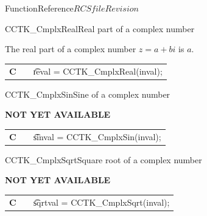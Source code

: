 \begin{cactuspart}{FunctionReference}{$RCSfile$}{$Revision$}
\begin{CCTKFunc}{CCTK\_CmplxReal}{Real part of a complex number}
\label{CCTK-CmplxReal}
\showcargs
\begin{params}
\end{params}
\begin{discussion}
The real part of a complex number $z=a+bi$ is $a$.
\end{discussion}
\begin{examples}
\begin{tabular}{@{}p{3cm}cp{11cm}}
\hfill {\bf C} && {\t reval = CCTK\_CmplxReal(inval)};
\end{tabular}
\end{examples}
\begin{errorcodes}
\end{errorcodes}
\end{CCTKFunc}

\begin{CCTKFunc}{CCTK\_CmplxSin}{Sine of a complex number}
\label{CCTK-CmplxSin}
\showcargs
\begin{params}
\end{params}
\begin{discussion}
{\bf NOT YET AVAILABLE}
\end{discussion}
\begin{examples}
\begin{tabular}{@{}p{3cm}cp{11cm}}
\hfill {\bf C} && {\t sinval = CCTK\_CmplxSin(inval)};
\end{tabular}
\end{examples}
\begin{errorcodes}
\end{errorcodes}
\end{CCTKFunc}

\begin{CCTKFunc}{CCTK\_CmplxSqrt}{Square root of a complex number}
\label{CCTK-CmplxSqrt}
\showcargs
\begin{params}
\end{params}
\begin{discussion}
{\bf NOT YET AVAILABLE}
\end{discussion}
\begin{examples}
\begin{tabular}{@{}p{3cm}cp{11cm}}
\hfill {\bf C} && {\t sqrtval = CCTK\_CmplxSqrt(inval)};
\end{tabular}
\end{examples}
\begin{errorcodes}
\end{errorcodes}
\end{CCTKFunc}


\end{cactuspart}

